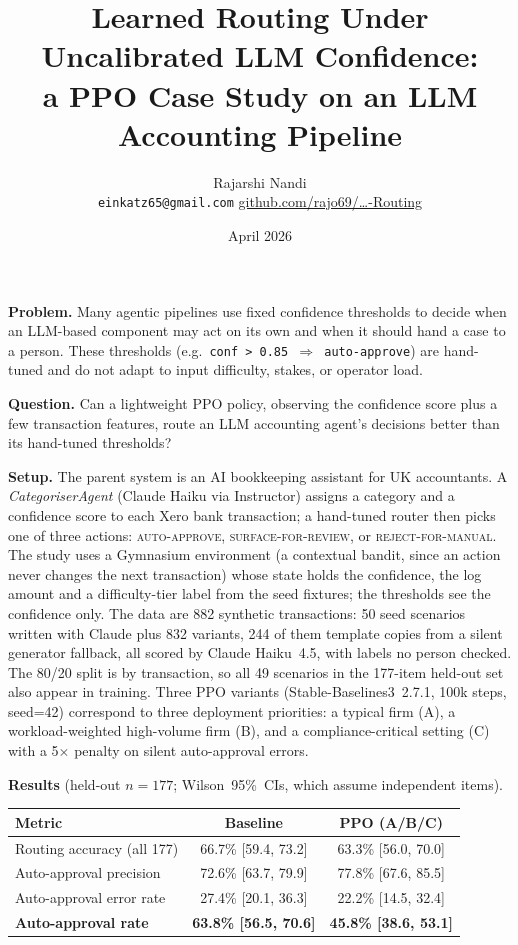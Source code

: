 \documentclass[10pt,a4paper]{article}
\title{\vspace{-0.6cm}\textbf{Learned Routing Under Uncalibrated LLM Confidence:\\a PPO Case Study on an LLM Accounting Pipeline}}
\author{Rajarshi Nandi \\ \small \texttt{einkatz65@gmail.com} \quad \href{https://github.com/rajo69/AI-Accountant-with-Reinforcement-Learning-Routing}{github.com/rajo69/\ldots-Routing}}
\date{\vspace{-0.4cm}\small April 2026}
\begin{document}
\maketitle
\vspace{-0.6cm}

\textbf{Problem.}
Many agentic pipelines use fixed confidence thresholds to decide when an
LLM-based component may act on its own and when it should hand a case to a
person. These thresholds (e.g.\ \texttt{conf > 0.85 $\Rightarrow$ auto-approve})
are hand-tuned and do not adapt to input difficulty, stakes, or operator load.

\textbf{Question.}
Can a lightweight PPO policy, observing the confidence score plus a few
transaction features, route an LLM accounting agent's decisions better than its
hand-tuned thresholds?

\textbf{Setup.}
The parent system is an AI bookkeeping assistant for UK accountants. A
\textit{CategoriserAgent} (Claude Haiku via Instructor) assigns a category and a
confidence score to each Xero bank transaction; a hand-tuned router then picks
one of three actions: \textsc{auto-approve}, \textsc{surface-for-review}, or
\textsc{reject-for-manual}. The study uses a Gymnasium environment (a
contextual bandit, since an action never changes the next transaction) whose
state holds the confidence, the log amount and a difficulty-tier label from the
seed fixtures; the thresholds see the confidence only. The data are 882
synthetic transactions: 50 seed scenarios written with Claude plus 832
variants, 244 of them template copies from a silent generator fallback, all
scored by Claude Haiku~4.5, with labels no person checked. The 80/20 split is
by transaction, so all 49 scenarios in the 177-item held-out set also appear
in training. Three PPO variants (Stable-Baselines3~2.7.1, 100k steps, seed=42)
correspond to three deployment priorities: a typical firm (A), a
workload-weighted high-volume firm (B), and a compliance-critical setting (C)
with a 5$\times$ penalty on silent auto-approval errors.

\textbf{Results} (held-out $n{=}177$; Wilson~95\%~CIs, which assume independent items).

\begin{center}
\small
\begin{tabular}{lcc}
\toprule
Metric & Baseline & PPO (A/B/C) \\
\midrule
Routing accuracy (all 177)     & 66.7\% [59.4, 73.2] & 63.3\% [56.0, 70.0] \\
Auto-approval precision        & 72.6\% [63.7, 79.9] & 77.8\% [67.6, 85.5] \\
Auto-approval error rate       & 27.4\% [20.1, 36.3] & 22.2\% [14.5, 32.4] \\
\textbf{Auto-approval rate}    & \textbf{63.8\% [56.5, 70.6]} & \textbf{45.8\% [38.6, 53.1]} \\
\bottomrule
\end{tabular}
\end{center}
\end{document}
